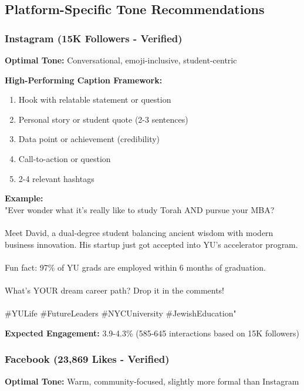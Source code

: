 \documentclass[12pt]{report}
\begin{document}
\subsection{Platform-Specific Tone Recommendations}

\subsubsection{Instagram (15K Followers - Verified)}

\textbf{Optimal Tone:} Conversational, emoji-inclusive, student-centric

\textbf{High-Performing Caption Framework:}
\begin{enumerate}
    \item Hook with relatable statement or question
    \item Personal story or student quote (2-3 sentences)
    \item Data point or achievement (credibility)
    \item Call-to-action or question
    \item 2-4 relevant hashtags
\end{enumerate}

\textbf{Example:}\\
"Ever wonder what it's really like to study Torah AND pursue your MBA? \\ \\
Meet David, a dual-degree student balancing ancient wisdom with modern business innovation. His startup just got accepted into YU's accelerator program. \\ \\
Fun fact: 97\% of YU grads are employed within 6 months of graduation. \\ \\
What's YOUR dream career path? Drop it in the comments! \\ \\
\#YULife \#FutureLeaders \#NYCUniversity \#JewishEducation"

\textbf{Expected Engagement:} 3.9-4.3\% (585-645 interactions based on 15K followers)

\subsubsection{Facebook (23,869 Likes - Verified)}

\textbf{Optimal Tone:} Warm, community-focused, slightly more formal than Instagram
\end{document}
